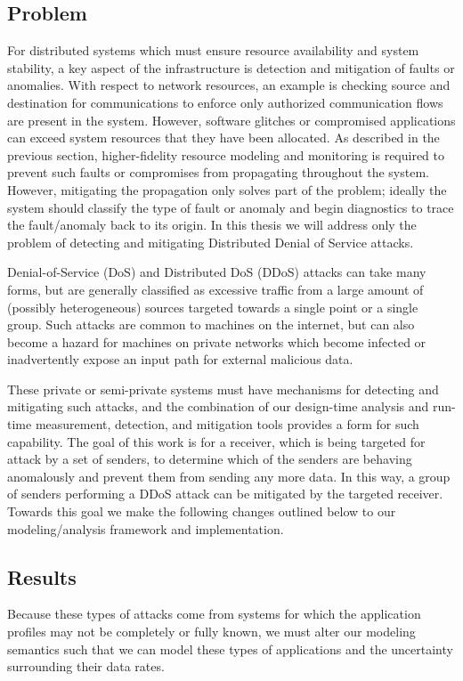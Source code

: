 \subsection{Problem}
For distributed systems which must ensure resource availability and
system stability, a key aspect of the infrastructure is detection and
mitigation of faults or anomalies.  With respect to network resources,
an example is checking source and destination for communications to
enforce only authorized communication flows are present in the system.
However, software glitches or compromised applications can exceed
system resources that they have been allocated.  As described in the
previous section, higher-fidelity resource modeling and monitoring is
required to prevent such faults or compromises from propagating
throughout the system.  However, mitigating the propagation only
solves part of the problem; ideally the system should classify the
type of fault or anomaly and begin diagnostics to trace the
fault/anomaly back to its origin.  In this thesis we will address only
the problem of detecting and mitigating Distributed Denial of Service
attacks.  

Denial-of-Service (DoS)\cite{rfc4732} and Distributed DoS (DDoS) attacks
can take many forms, but are generally classified as excessive traffic
from a large amount of (possibly heterogeneous) sources targeted
towards a single point or a single group.  Such attacks are common to
machines on the internet, but can also become a hazard for machines on
private networks which become infected or inadvertently expose an
input path for external malicious data.

These private or semi-private systems must have mechanisms for
detecting and mitigating such attacks, and the combination of our
design-time analysis and run-time measurement, detection, and
mitigation tools provides a form for such capability.  The goal of
this work is for a receiver, which is being targeted for attack by a
set of senders, to determine which of the senders are behaving
anomalously and prevent them from sending any more data.  In this way,
a group of senders performing a DDoS attack can be mitigated by the
targeted receiver.  Towards this goal we make the following changes
outlined below to our modeling/analysis framework and implementation.

\subsection{Results}
Because these types of attacks come from systems for which the
application profiles may not be completely or fully known, we must
alter our modeling semantics such that we can model these types of
applications and the uncertainty surrounding their data rates.  

